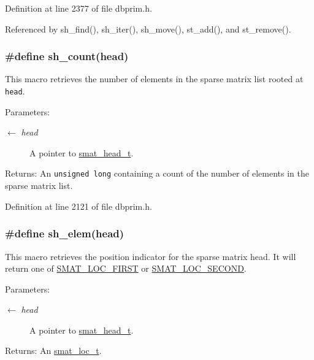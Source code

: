 Definition at line 2377 of file dbprim.h.

Referenced by sh\_\-find(), sh\_\-iter(), sh\_\-move(), st\_\-add(), and st\_\-remove().\hypertarget{group__dbprim__smat_ga47}{
\subsubsection[sh\_\-count]{\setlength{\rightskip}{0pt plus 5cm}\#define sh\_\-count(head)}}
\label{group__dbprim__smat_ga47}


This macro retrieves the number of elements in the sparse matrix list rooted at {\tt head}.

\begin{Desc}
\item[Parameters:]
\begin{description}
\item[\mbox{$\leftarrow$} {\em head}]A pointer to \hyperlink{group__dbprim__smat_ga1}{smat\_\-head\_\-t}.\end{description}
\end{Desc}
\begin{Desc}
\item[Returns:]An {\tt unsigned long} containing a count of the number of elements in the sparse matrix list.\end{Desc}


Definition at line 2121 of file dbprim.h.\hypertarget{group__dbprim__smat_ga44}{
\subsubsection[sh\_\-elem]{\setlength{\rightskip}{0pt plus 5cm}\#define sh\_\-elem(head)}}
\label{group__dbprim__smat_ga44}


This macro retrieves the position indicator for the sparse matrix head. It will return one of \hyperlink{group__dbprim__smat_gga70a137}{SMAT\_\-LOC\_\-FIRST} or \hyperlink{group__dbprim__smat_gga70a138}{SMAT\_\-LOC\_\-SECOND}.

\begin{Desc}
\item[Parameters:]
\begin{description}
\item[\mbox{$\leftarrow$} {\em head}]A pointer to \hyperlink{group__dbprim__smat_ga1}{smat\_\-head\_\-t}.\end{description}
\end{Desc}
\begin{Desc}
\item[Returns:]An \hyperlink{group__dbprim__smat_ga6}{smat\_\-loc\_\-t}.\end{Desc}



